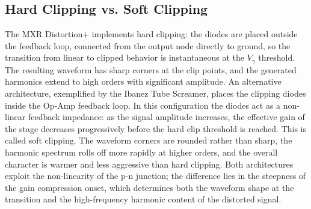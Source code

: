 \subsection{Hard Clipping vs. Soft Clipping}

The MXR Distortion+ implements hard clipping: the diodes are placed outside the feedback loop, connected from the output node directly to ground, so the transition from linear to clipped behavior is instantaneous at the \(V_\gamma\) threshold.
The resulting waveform has sharp corners at the clip points, and the generated harmonics extend to high orders with significant amplitude.
An alternative architecture, exemplified by the Ibanez Tube Screamer, places the clipping diodes inside the Op-Amp feedback loop.
In this configuration the diodes act as a non-linear feedback impedance: as the signal amplitude increases, the effective gain of the stage decreases progressively before the hard clip threshold is reached.
This is called soft clipping.
The waveform corners are rounded rather than sharp, the harmonic spectrum rolls off more rapidly at higher orders, and the overall character is warmer and less aggressive than hard clipping.
Both architectures exploit the non-linearity of the p-n junction; the difference lies in the steepness of the gain compression onset, which determines both the waveform shape at the transition and the high-frequency harmonic content of the distorted signal.
